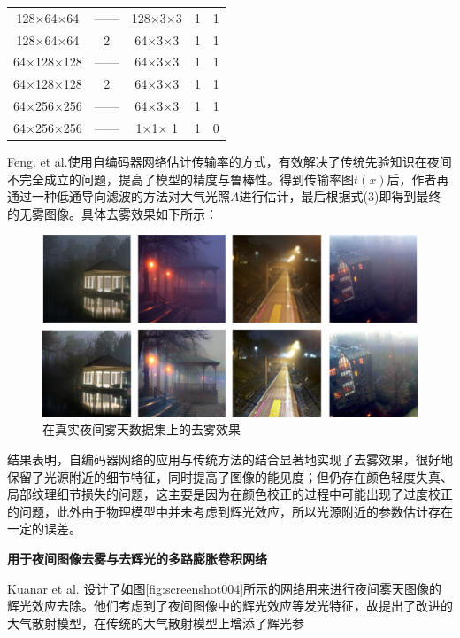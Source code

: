 \begin{multicols}{2}
\begin{table}[H]
\begin{tabular}{ccccc}
		128$\times$64$\times$64    &    ——        & 128$\times$3$\times$3 & 1      & 1       \\
		128$\times$64$\times$64       & 2          & 64$\times$3$\times$3  & 1      & 1       \\
		64$\times$128$\times$128      &  ——          & 64$\times$3$\times$3  & 1      & 1       \\
		64$\times$128$\times$128      & 2          & 64$\times$3$\times$3   & 1      & 1       \\
		64$\times$256$\times$256      &  ——          & 64$\times$3$\times$3   & 1      & 1       \\
		64$\times$256$\times$256      &  ——          & 1$\times$1$\times$ 1   & 1      & 0      \\ 
		\bottomrule[1.5pt]
	\end{tabular}
\end{table}
Feng. et al.使用自编码器网络估计传输率的方式，有效解决了传统先验知识在夜间不完全成立的问题，提高了模型的精度与鲁棒性。得到传输率图$t(x)$后，作者再通过一种低通导向滤波的方法对大气光照$A$进行估计，最后根据式(3)即得到最终的无雾图像。具体去雾效果如下所示：
\begin{figure}[H]
	\centering
	\includegraphics[width=1.0\linewidth]{pics/screenshot012}
	\caption{在真实夜间雾天数据集上的去雾效果}
	\label{fig:screenshot012}
\end{figure}

结果表明，自编码器网络的应用与传统方法的结合显著地实现了去雾效果，很好地保留了光源附近的细节特征，同时提高了图像的能见度；但仍存在颜色轻度失真、局部纹理细节损失的问题，这主要是因为在颜色校正的过程中可能出现了过度校正的问题，此外由于物理模型中并未考虑到辉光效应，所以光源附近的参数估计存在一定的误差。


\noindent\textbf{用于夜间图像去雾与去辉光的多路膨胀卷积网络}

Kuanar et al. \cite{20} 设计了如图\ref{fig:screenshot004}所示的网络用来进行夜间雾天图像的辉光效应去除。他们考虑到了夜间图像中的辉光效应等发光特征，故提出了改进的大气散射模型，在传统的大气散射模型上增添了辉光参
\end{multicols}
